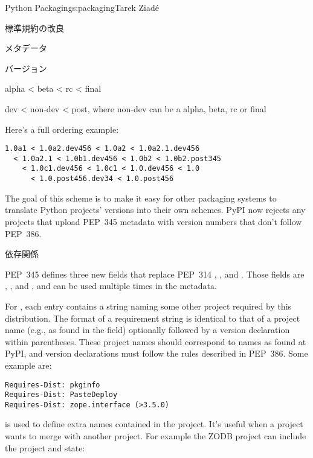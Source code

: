 \begin{aosachapter}{Python Packaging}{s:packaging}{Tarek Ziad\'{e}}
\begin{aosasect1}{標準規約の改良}
\begin{aosasect2}{メタデータ}
\begin{aosasect3}{バージョン}
\begin{aosaitemize}
  \item alpha {\textless} beta {\textless} rc {\textless} final

  \item dev {\textless} non-dev {\textless} post, where non-dev can be a alpha, beta,
  rc or final

\end{aosaitemize}

\noindent
Here's a full ordering example:

\begin{verbatim}
1.0a1 < 1.0a2.dev456 < 1.0a2 < 1.0a2.1.dev456
  < 1.0a2.1 < 1.0b1.dev456 < 1.0b2 < 1.0b2.post345
    < 1.0c1.dev456 < 1.0c1 < 1.0.dev456 < 1.0
      < 1.0.post456.dev34 < 1.0.post456
\end{verbatim}

\noindent
The goal of this scheme is to make it easy for other packaging systems
to translate Python projects' versions into their own schemes.  PyPI
now rejects any projects that upload PEP~345 metadata with version numbers
that don't follow PEP~386.

\end{aosasect3}

\begin{aosasect3}{依存関係}

PEP~345 defines three new fields that replace PEP~314 ,
, and . Those fields are
, , and ,
and can be used multiple times in the metadata.

For , each entry contains a string naming some
other  project required by this distribution.  The
format of a requirement string is identical to that of a
 project name (e.g., as found in the  field)
optionally followed by a version declaration within parentheses.
These  project names should correspond to names as
found at PyPI, and version declarations must follow the rules
described in PEP~386. Some example are:

\begin{verbatim}
Requires-Dist: pkginfo
Requires-Dist: PasteDeploy
Requires-Dist: zope.interface (>3.5.0)
\end{verbatim}

\noindent {} is used to define extra names contained in the
project.  It's useful when a project wants to merge with another
project. For example the ZODB project can include the
 project and state:


\end{aosasect3}
\end{aosasect2}
\end{aosasect1}
\end{aosachapter}
